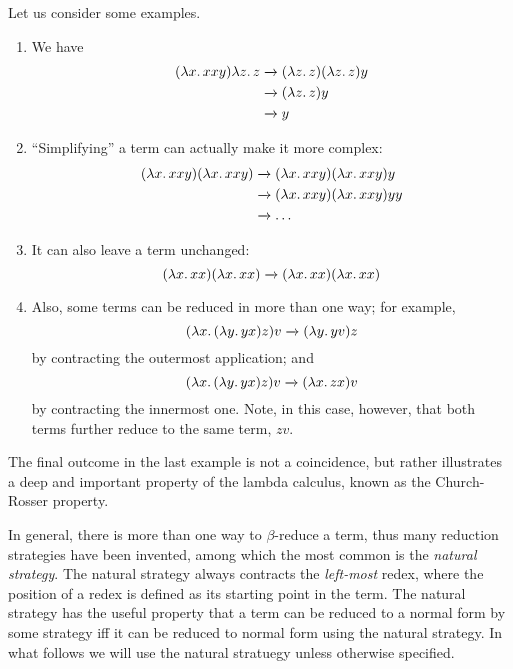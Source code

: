 \documentclass[../../../include/open-logic-section]{subfiles}
\begin{document}
Let us consider some examples.
\begin{enumerate}
\item We have
\begin{align*}
(\lambd[x][xxy]) \lambd[z][z] & \redone (\lambd[z][z])(\lambd[z][z]) y \\
& \redone (\lambd[z][z]) y \\
& \redone y
\end{align*}
\item ``Simplifying'' a term can actually make it more complex:
\begin{align*}
(\lambd[x][xxy])(\lambd[x][xxy]) & \redone (\lambd[x][xxy])(\lambd[x][xxy])y \\
& \redone (\lambd[x][xxy])(\lambd[x][xxy])yy \\
& \redone \dots
\end{align*}
\item It can also leave a term unchanged:
\[
(\lambd[x][xx])(\lambd[x][xx]) \redone (\lambd[x][xx])(\lambd[x][xx])
\]
\item Also, some terms can be reduced in more than one way; for
  example,
\[
(\lambd[x][(\lambd[y][yx]) z]) v \redone (\lambd[y][yv]) z
\]
by contracting the outermost application; and
\[
(\lambd[x][(\lambd[y][yx]) z]) v \redone (\lambd[x][zx]) v
\]
by contracting the innermost one. Note, in this case, however, that
both terms further reduce to the same term, $zv$.
\end{enumerate}

The final outcome in the last example is not a coincidence, but rather
illustrates a deep and important property of the lambda calculus, known as the
Church-Rosser property.

\begin{digress}
  In general, there is more than one way to $\beta$-reduce a term,
  thus many reduction strategies have been invented, among which the
  most common is the \emph{natural strategy}.  The natural strategy
  always contracts the \emph{left-most} redex, where the position of a
  redex is defined as its starting point in the term.  The natural
  strategy has the useful property that a term can be reduced to a
  normal form by some strategy iff it can be reduced to normal form
  using the natural strategy. In what follows we will use the natural
  stratuegy unless otherwise specified.
\end{digress}
\end{document}
